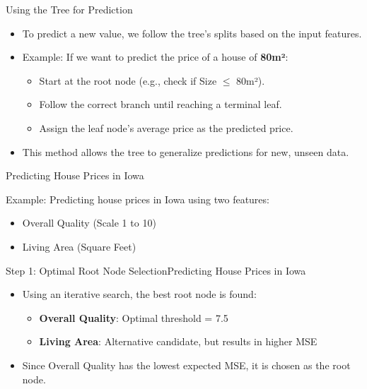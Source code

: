 \documentclass[11pt]{beamer}
\begin{document}
%
\begin{frame}{Using the Tree for Prediction}
    \begin{itemize}
        \item To predict a new value, we follow the tree’s splits based on the input features.
        \item Example: If we want to predict the price of a house of \textbf{80m²}:
        \begin{itemize}
            \item Start at the root node (e.g., check if Size $\leq$ 80m²).
            \item Follow the correct branch until reaching a terminal leaf.
            \item Assign the leaf node’s average price as the predicted price.
        \end{itemize}
        \item This method allows the tree to generalize predictions for new, unseen data.
    \end{itemize}
\end{frame}
%
%
\begin{frame}{Predicting House Prices in Iowa}

Example: Predicting house prices in Iowa using two features:

        \begin{itemize}
            \item Overall Quality (Scale 1 to 10)
            \item Living Area (Square Feet)
        \end{itemize}
\end{frame}
%
%
\begin{frame}{Step 1: Optimal Root Node Selection}{Predicting House Prices in Iowa}
    \begin{itemize}
        \item Using an iterative search, the best root node is found:
        \begin{itemize}
            \item \textbf{Overall Quality}: Optimal threshold = 7.5
            \item \textbf{Living Area}: Alternative candidate, but results in higher MSE
        \end{itemize}
        \item Since Overall Quality has the lowest expected MSE, it is chosen as the root node.
    \end{itemize}
\end{frame}
\end{document}
